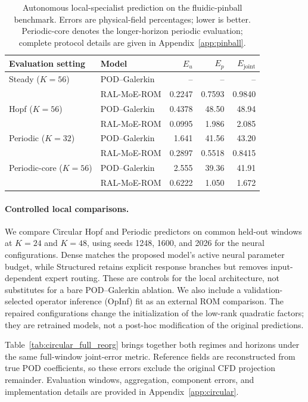\begin{table}[H]
\centering
\caption{
Autonomous local-specialist prediction on the fluidic-pinball benchmark. Errors are physical-field percentages; lower is better. Periodic-core denotes the longer-horizon periodic evaluation; complete protocol details are given in Appendix~\ref{app:pinball}.
}
\label{tab:pinball_autonomous}
\small
\setlength{\tabcolsep}{5pt}
\begin{tabular}{@{}llrrr@{}}
\toprule
Evaluation setting & Model & $E_u$ & $E_p$ & $E_{\mathrm{joint}}$ \\
\midrule
Steady ($K=56$)
& POD--Galerkin
& -- & -- & -- \\
& RAL-MoE-ROM
& 0.2247 & 0.7593 & 0.9840 \\
\addlinespace

Hopf ($K=56$)
& POD--Galerkin
& 0.4378 & 48.50 & 48.94 \\
& RAL-MoE-ROM
& 0.0995 & 1.986 & 2.085 \\
\addlinespace

Periodic ($K=32$)
& POD--Galerkin
& 1.641 & 41.56 & 43.20 \\
& RAL-MoE-ROM
& 0.2897 & 0.5518 & 0.8415 \\
\addlinespace

Periodic-core ($K=56$)
& POD--Galerkin
& 2.555 & 39.36 & 41.91 \\
& RAL-MoE-ROM
& 0.6222 & 1.050 & 1.672 \\
\bottomrule
\end{tabular}
\end{table}

\paragraph{Controlled local comparisons.}
We compare Circular Hopf and Periodic predictors on common held-out
windows at $K=24$ and $K=48$, using seeds 1248, 1600, and 2026 for
the neural configurations. Dense matches the proposed model's active
neural parameter budget, while Structured retains explicit response
branches but removes input-dependent expert routing. These are
controls for the local architecture, not substitutes for a bare
POD--Galerkin ablation. We also include a validation-selected
operator inference (OpInf) fit as an external ROM comparison.
The repaired configurations change the initialization of the
low-rank quadratic factors; they are retrained models, not a
post-hoc modification of the original predictions.

Table~\ref{tab:circular_full_reorg} brings together both regimes and
horizons under the same full-window joint-error metric.
Reference fields are reconstructed from true POD coefficients, so
these errors exclude the original CFD projection remainder.
Evaluation windows, aggregation, component errors, and implementation
details are provided in Appendix~\ref{app:circular}.

